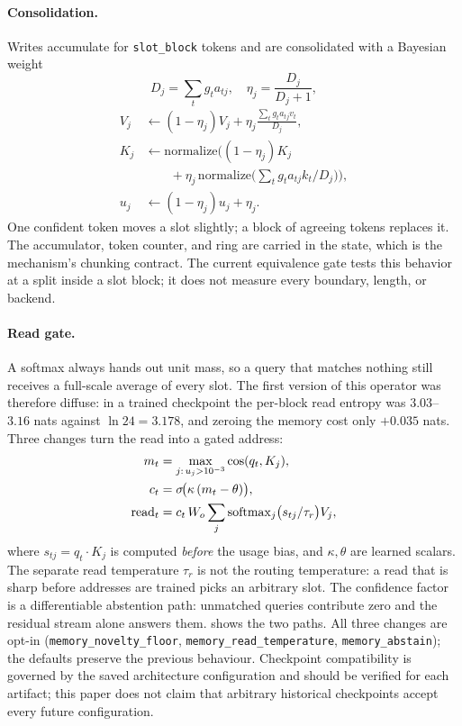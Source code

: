 \paragraph{Consolidation.}
Writes accumulate for \texttt{slot\_block} tokens and are consolidated with a Bayesian weight
\begin{equation}
\label{eq:consolidate}
D_j=\sum_t g_t a_{tj},\quad \eta_j=\frac{D_j}{D_j+1},
\end{equation}
\begin{equation}
\begin{aligned}
V_j&\leftarrow(1-\eta_j)V_j+\eta_j\frac{\sum_t g_t a_{tj}v_t}{D_j},\\
K_j&\leftarrow\mathrm{normalize}\!\Big((1-\eta_j)K_j\\
&\qquad+\eta_j\,\mathrm{normalize}\big(\textstyle\sum_t g_ta_{tj}k_t/D_j\big)\Big),\\
u_j&\leftarrow(1-\eta_j)u_j+\eta_j .
\end{aligned}
\end{equation}
One confident token moves a slot slightly; a block of agreeing tokens replaces it. The
accumulator, token counter, and ring are carried in the state, which is the mechanism's
chunking contract. The current equivalence gate tests this behavior at a split inside a slot
block; it does not measure every boundary, length, or backend.

\paragraph{Read gate.}
A softmax always hands out unit mass, so a query that matches nothing still receives a
full-scale average of every slot. The first version of this operator was therefore diffuse:
in a trained checkpoint the per-block read entropy was $3.03$--$3.16$ nats against
$\ln 24=3.178$, and zeroing the memory cost only $+0.035$ nats. Three changes turn the read
into a gated address:
\begin{equation}
\label{eq:read}
\begin{aligned}
m_t&=\max_{j:\,u_j>10^{-3}}\cos(q_t,K_j),\\
c_t&=\sigma\!\big(\kappa\,(m_t-\theta)\big),\\
\mathrm{read}_t&=c_t\,W_o\sum_j\operatorname{softmax}_j\!\big(s_{tj}/\tau_r\big)V_j,
\end{aligned}
\end{equation}
where $s_{tj}=q_t\!\cdot\!K_j$ is computed \emph{before} the usage bias, and $\kappa,\theta$ are
learned scalars. The separate read temperature $\tau_r$ is not the routing temperature: a read
that is sharp before addresses are trained picks an arbitrary slot. The confidence factor is a
differentiable abstention path: unmatched queries contribute zero and the residual stream alone
answers them.  shows the two paths. All three changes are opt-in
(\texttt{memory\_novelty\_floor}, \texttt{memory\_read\_temperature},
\texttt{memory\_abstain}); the defaults preserve the previous behaviour. Checkpoint
compatibility is governed by the saved architecture configuration and should be verified for
each artifact; this paper does not claim that arbitrary historical checkpoints accept every
future configuration.

